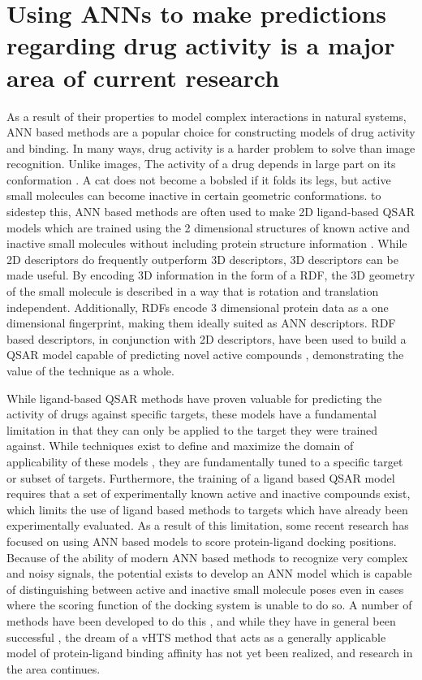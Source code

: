 \section{Using \ac{ANN}s to make predictions regarding drug activity is a major area of current research}

As a result of their properties to model complex interactions in natural systems, \ac{ANN} based methods are a popular choice for constructing models of drug activity and binding. 
In many ways, drug activity is a harder problem to solve than image recognition.
Unlike images, The activity of a drug depends in large part on its conformation \citep{Nicklaus:1995tu}.
A cat does not become a bobsled if it folds its legs, but active small molecules can become inactive in certain geometric conformations.
to sidestep this, \ac{ANN} based methods are often used to make 2D ligand-based \ac{QSAR} models which are trained using the 2 dimensional structures of known active and inactive small molecules without including protein structure information \citep{Myint:2012ts}.
While 2D descriptors do frequently outperform 3D descriptors, 3D descriptors can be made useful.
By encoding 3D information in the form of a \ac{RDF}, the 3D geometry of the small molecule is described in a way that is rotation and translation independent.
Additionally, \ac{RDF}s encode 3 dimensional protein data as a one dimensional fingerprint, making them ideally suited as \ac{ANN} descriptors.
\ac{RDF} based descriptors, in conjunction with 2D descriptors, have been used to build a \ac{QSAR} model capable of predicting novel active compounds \citep{Mueller:2010dx}, demonstrating the value of the technique as a whole.

While ligand-based \ac{QSAR} methods have proven valuable for predicting the activity of drugs against specific targets, these models have a fundamental limitation in that they can only be applied to the target they were trained against.
While techniques exist to define and maximize the domain of applicability of these models \citep{Sahigara:2012kb}, they are fundamentally tuned to a specific target or subset of targets. 
Furthermore, the training of a ligand based \ac{QSAR} model requires that a set of experimentally known active and inactive compounds exist, which limits the use of ligand based methods to targets which have already been experimentally evaluated.
As a result of this limitation, some recent research has focused on using \ac{ANN} based models to score protein-ligand docking positions.
Because of the ability of modern \ac{ANN} based methods to recognize very complex and noisy signals, the potential exists to develop an \ac{ANN} model which is capable of distinguishing between active and inactive small molecule poses even in cases where the scoring function of the docking system is unable to do so. 
A number of methods have been developed to do this \citep{Durrant:2013db}, and while they have in general been successful \citep{Durrant:2011dx}, the dream of a \ac{vHTS} method that acts as a generally applicable model of protein-ligand binding affinity has not yet been realized, and research in the area continues. 


